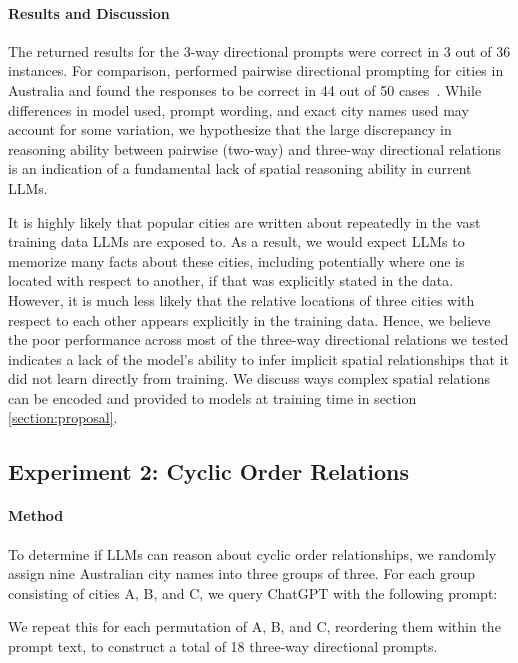 \paragraph{Results and Discussion}
The returned results for the 3-way directional prompts were correct in 3 out of 36 instances.
For comparison, \citeauthor{Qi2023} performed pairwise directional prompting for cities in Australia and found the responses to be correct in 44 out of 50 cases~\cite{Qi2023}.
While differences in model used, prompt wording, and exact city names used may account for some variation, we hypothesize that the large discrepancy in reasoning ability between pairwise (two-way) and three-way directional relations is an indication of a fundamental lack of spatial reasoning ability in current LLMs.

It is highly likely that popular cities are written about repeatedly in the vast training data LLMs are exposed to.
As a result, we would expect LLMs to memorize many facts about these cities, including potentially where one is located with respect to another, if that was explicitly stated in the data.
However, it is much less likely that the relative locations of three cities with respect to each other appears explicitly in the training data.
Hence, we believe the poor performance across most of the three-way directional relations we tested indicates a lack of the model's ability to infer implicit spatial relationships that it did not learn directly from training.
We discuss ways complex spatial relations can be encoded and provided to models at training time in section \ref{section:proposal}.


\subsection{Experiment 2: Cyclic Order Relations}
\paragraph{Method}
To determine if LLMs can reason about cyclic order relationships, we randomly assign nine Australian city names into three groups of three.
For each group consisting of cities A, B, and C, we query ChatGPT with the following prompt: 
\begin{center}
\end{center}
We repeat this for each permutation of A, B, and C, reordering them within the prompt text, to construct a total of 18 three-way directional prompts.

